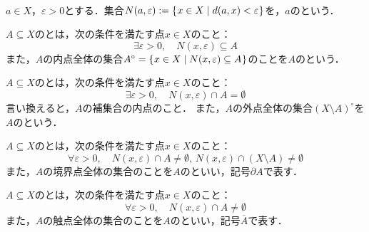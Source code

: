 \documentclass[uplatex]{jsarticle}
\begin{document}
\begin{teigi}[内点・外点・境界点・触点]~\par
     $a \in X$，$\varepsilon > 0$とする．集合$N(a,\varepsilon) := \Set{\hspace{-1.8pt} x \in X | d(a,x) < \varepsilon \hspace{-1.8pt}}$を，$a$のという．

     $A \subseteq X$のとは，次の条件を満たす点$x \in X$のこと：
    \begin{equation}
        \exists \varepsilon > 0, \quad N(x,\varepsilon) \subseteq A
    \end{equation}
    また，$A$の内点全体の集合$A^{\circ} = \Set{\hspace{-1.8pt} x \in X | N(x, \varepsilon) \subseteq A \hspace{-1.8pt}}$のことを$A$のという．

     $A \subseteq X$のとは，次の条件を満たす点$x \in X$のこと：
    \begin{equation}
        \exists \varepsilon > 0, \quad N(x , \varepsilon ) \cap A = \emptyset
    \end{equation}
    言い換えると，$A$の補集合の内点のこと．
    また，$A$の外点全体の集合$(X \setminus A)^{\circ}$を$A$のという．

     $A \subseteq X$のとは，次の条件を満たす点$x \in X$のこと：
    \begin{equation}
        \forall \varepsilon > 0, \quad N(x, \varepsilon) \cap A \neq \emptyset, \, N(x,\varepsilon) \cap (X \setminus A) \neq \emptyset
    \end{equation}
    また，$A$の境界点全体の集合のことを$A$のといい，記号$\partial A$で表す．

     $A \subseteq X$のとは，次の条件を満たす点$x \in X$のこと：
    \begin{equation}
        \forall \varepsilon > 0, \quad N (x,\varepsilon) \cap A \neq \emptyset
    \end{equation}
    また，$A$の触点全体の集合のことを$A$のといい，記号$\overline{A}$で表す．
\end{teigi}
\end{document}
